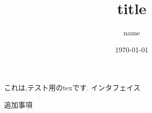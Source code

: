 \documentclass[a4paper, 10pt, titlepage, uplatex]{jsarticle}
\title{title}
\author{name}
\date{\today}
\begin{document}
\maketitle

\section{}
これは,テスト用のtexです.
インタフェイス

追加事項
\end{document}

